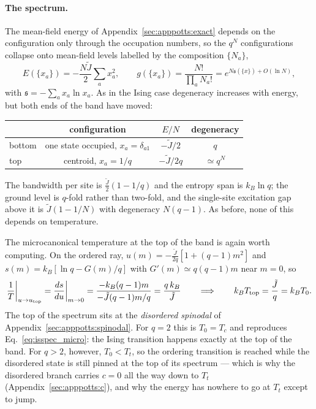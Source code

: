\documentclass[10pt,a4paper]{article}
\theoremstyle{remark}
\begin{document}
\paragraph{The spectrum.} The mean-field energy of
Appendix~\ref{sec:apppotts:exact} depends on the configuration only through the
occupation numbers, so the $q^{N}$ configurations collapse onto mean-field levels
labelled by the composition $\{N_a\}$,
\begin{equation}\label{eq:ptspec_levels}
E(\{x_a\})=-\frac{N\tilde J}{2}\sum_a x_a^{2},
\qquad
g(\{x_a\})=\frac{N!}{\prod_a N_a!}=e^{N\mathfrak{s}(\{x\})+O(\ln N)} ,
\end{equation}
with $\mathfrak{s}=-\sum_ax_a\ln x_a$. As in the Ising case degeneracy increases
with energy, but both ends of the band have moved:
\begin{center}
\begin{tabular}{lccc}
\toprule
& configuration & $E/N$ & degeneracy \\
\midrule
bottom & one state occupied, $x_a=\delta_{a1}$ & $-\tilde J/2$ & $q$ \\
top & centroid, $x_a=1/q$ & $-\tilde J/2q$ & $\simeq q^{N}$ \\
\bottomrule
\end{tabular}
\end{center}
The bandwidth per site is $\tfrac{\tilde J}{2}(1-1/q)$ and the entropy span is
$k_B\ln q$; the ground level is $q$-fold rather than two-fold, and the
single-site excitation gap above it is $\tilde J(1-1/N)$ with degeneracy
$N(q-1)$. As before, none of this depends on temperature.

The microcanonical temperature at the top of the band is again worth computing.
On the ordered ray, $u(m)=-\frac{\tilde J}{2q}[1+(q-1)m^{2}]$ and
$s(m)=k_B[\ln q-G(m)/q]$ with $G'(m)\simeq q(q-1)m$ near $m=0$, so
\begin{equation}\label{eq:ptspec_micro}
\frac{1}{T}\bigg|_{u\to u_{\rm top}}=\frac{ds}{du}\bigg|_{m\to0}
=\frac{-k_B(q-1)m}{-\tilde J(q-1)m/q}=\frac{q\,k_B}{\tilde J}
\qquad\Longrightarrow\qquad
k_BT_{\rm top}=\frac{\tilde J}{q}=k_BT_0 .
\end{equation}
The top of the spectrum sits at the \emph{disordered spinodal} of
Appendix~\ref{sec:apppotts:spinodal}. For $q=2$ this is $T_0=T_c$ and reproduces
Eq.~\eqref{eq:isspec_micro}: the Ising transition happens exactly at the top of
the band. For $q>2$, however, $T_0<T_t$, so the ordering transition is reached
while the disordered state is still pinned at the top of its spectrum --- which
is why the disordered branch carries $c=0$ all the way down to $T_t$
(Appendix~\ref{sec:apppotts:c}), and why the energy has nowhere to go at $T_t$
except to jump.
\end{document}
